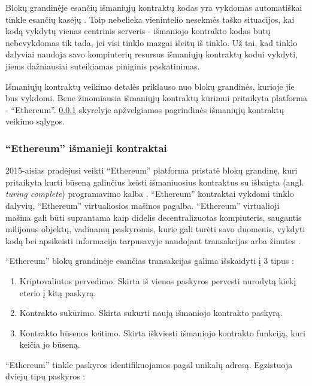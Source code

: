 Blokų grandinėje esančių išmaniųjų kontraktų kodas yra vykdomas automatiškai tinkle esančių kasėjų \cite{Zheng2017}.
Taip nebelieka vienintelio nesekmės taško situacijos, kai kodą vykdytų vienas centrinis serveris - išmaniojo kontrakto
kodas butų nebevykdomas tik tada, jei visi tinklo mazgai išeitų iš tinklo. Už tai, kad tinklo dalyviai naudoja savo kompiuterių
resursus išmaniųjų kontraktų kodui vykdyti, jiems dažniausiai suteikiamas piniginis paskatinimas.

Išmaniųjų kontraktų veikimo detalės priklauso nuo blokų grandinės, kurioje jie bus vykdomi.
Bene žinomiausia išmaniųjų kontraktų kūrimui pritaikyta platforma - \enquote{Ethereum}.
\hypertarget{section:ethereumIntro}{\ref{section:ethereumIntro}} skyrelyje apžvelgiamos pagrindinės išmaniųjų kontraktų
veikimo sąlygos.

\subsubsection{\enquote{Ethereum} išmanieji kontraktai} \label{section:ethereumIntro}

2015-aisias pradėjusi veikti \enquote{Ethereum} platforma pristatė blokų grandinę, kuri pritaikyta kurti būseną galinčius keisti
išmaniuosius kontraktus su išbaigta
(angl. \textit{turing complete}) programavimo kalba \cite{EthereumWhitePaper}. \enquote{Ethereum} kontraktai vykdomi tinklo
dalyvių, \enquote{Ethereum} virtualiosios mašinos pagalba.  \enquote{Ethereum} virtualioji mašina gali būti suprantama kaip didelis decentralizuotas
kompiuteris, saugantis milijonus objektų, vadinamų paskyromis, kurie gali turėti savo duomenis,
vykdyti kodą bei apsikeisti informacija tarpusavyje naudojant transakcijas arba žinutes \cite{EthereumWhitePaper}.

\enquote{Ethereum} blokų grandinėje esančias transakcijas galima išskaidyti į 3 tipus \cite{EthereumWhitePaper}:

\begin{enumerate}
    \item Kriptovaliutos pervedimo. Skirta iš vienos paskyros pervesti nurodytą kiekį eterio į kitą paskyrą.
    \item Kontrakto sukūrimo. Skirta sukurti naują išmaniojo kontrakto paskyrą.
    \item Kontrakto būsenos keitimo. Skirta iškviesti išmaniojo kontrakto funkciją, kuri keičia jo būseną. 
\end{enumerate}

\enquote{Ethereum} tinkle paskyros identifikuojamos pagal unikalų adresą. Egzistuoja dviejų tipų paskyros \cite{EthereumWhitePaper}:

